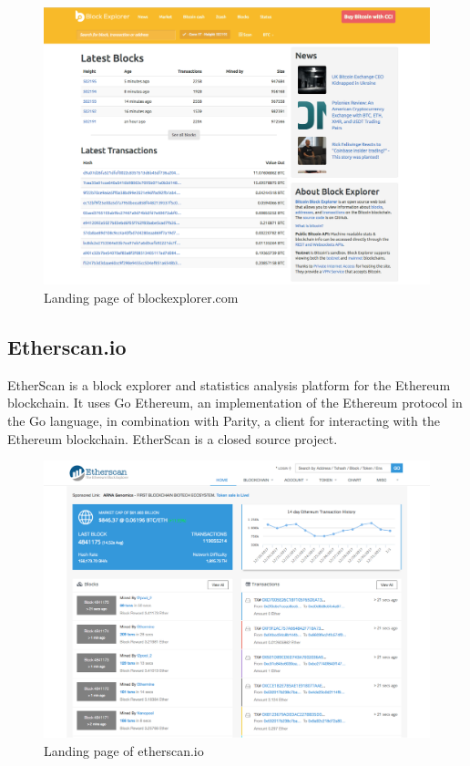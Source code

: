 \begin{figure}
  \includegraphics[width=\linewidth]{blockexplorer.png}
  \caption{Landing page of blockexplorer.com}
  \label{fig:blockexplorer1}
\end{figure}

\subsection{Etherscan.io}
EtherScan is a block explorer and statistics analysis platform for the Ethereum blockchain. It uses Go Ethereum, an implementation of the Ethereum protocol in the Go language, in combination with Parity, a client for interacting with the Ethereum blockchain. EtherScan is a closed source project.

\begin{figure}
  \includegraphics[width=\linewidth]{etherscan.png}
  \caption{Landing page of etherscan.io}
  \label{fig:etherscan1}
\end{figure}

